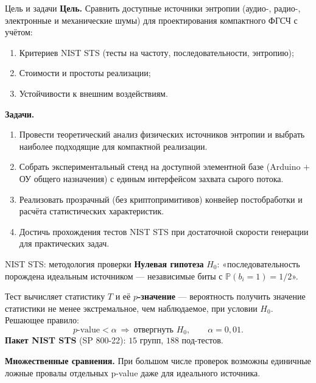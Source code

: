 \documentclass[14pt,aspectratio=169]{beamer}
\begin{document}
\begin{frame}{Цель и задачи}
  \scriptsize
  \textbf{Цель.} Сравнить доступные источники энтропии (аудио-, радио-, электронные и механические шумы) для проектирования компактного ФГСЧ с учётом:
  \vspace{0.2em}
  \begin{enumerate}
    \setlength{\itemsep}{0.15em}
    \item Критериев NIST STS (тесты на частоту, последовательности, энтропию);
    \item Стоимости и простоты реализации;
    \item Устойчивости к внешним воздействиям.
  \end{enumerate}
  \vspace{0.4em}
  \textbf{Задачи.}
  \vspace{0.2em}
  \begin{enumerate}
    \setlength{\itemsep}{0.15em}
    \item Провести теоретический анализ физических источников энтропии и выбрать наиболее подходящие для компактной реализации.
    \item Собрать экспериментальный стенд на доступной элементной базе (Arduino $+$ ОУ общего назначения) с единым интерфейсом захвата сырого потока.
    \item Реализовать прозрачный (без криптопримитивов) конвейер постобработки и расчёта статистических характеристик.
    \item Достичь прохождения тестов NIST STS при достаточной скорости генерации для практических задач.
  \end{enumerate}
\end{frame}

\begin{frame}{NIST STS: методология проверки}
  \footnotesize
  \textbf{Нулевая гипотеза} $H_0$: «последовательность порождена идеальным источником --- независимые биты с $\mathbb{P}(b_i{=}1)=1/2$».
  \par\vspace{0.4em}
  Тест вычисляет статистику $T$ и её \textbf{$p$-значение} --- вероятность получить значение статистики не менее экстремальное, чем наблюдаемое, при условии $H_0$. Решающее правило:
  \[
    p\text{-value}<\alpha\ \Rightarrow\ \text{отвергнуть } H_0,\qquad \alpha=0{,}01.
  \]
  \textbf{Пакет NIST STS} (SP 800-22): $15$ групп, $188$ под-тестов.
  \par\vspace{0.4em}
  \textbf{Множественные сравнения.} При большом числе проверок возможны единичные ложные провалы отдельных p-value даже для идеального источника.
  \par\vspace{0.4em}
\end{frame}
\end{document}
